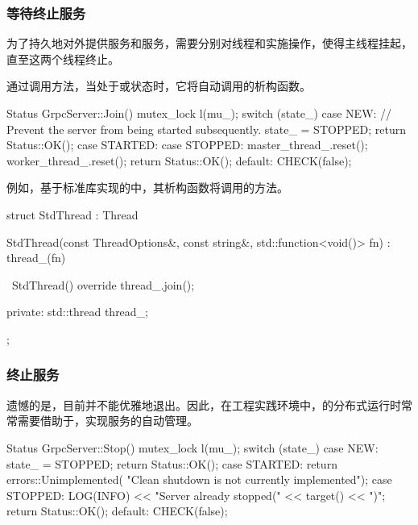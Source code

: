 \begin{content}
\subsubsection{等待终止服务}

为了持久地对外提供服务和服务，需要分别对线程和实施操作，使得主线程挂起，直至这两个线程终止。

通过调用方法，当处于或状态时，它将自动调用的析构函数。

\begin{leftbar}
\begin{c++}
Status GrpcServer::Join() {
  mutex_lock l(mu_);
  switch (state_) {
    case NEW:
      // Prevent the server from being started subsequently.
      state_ = STOPPED;
      return Status::OK();
    case STARTED:
    case STOPPED:
      master_thread_.reset();
      worker_thread_.reset();
      return Status::OK();
    default:
      CHECK(false);
  }
}
\end{c++}
\end{leftbar}

例如，基于标准库实现的中，其析构函数将调用的方法。

\begin{leftbar}
\begin{c++}
struct StdThread : Thread {
  StdThread(const ThreadOptions&, const string&, 
      std::function<void()> fn)
    : thread_(fn) {
  }

  ~StdThread() override { 
    thread_.join(); 
  }

 private:
  std::thread thread_;
};
\end{c++}
\end{leftbar}

\subsubsection{终止服务}

遗憾的是，目前并不能优雅地退出。因此，在工程实践环境中，\tf{}的分布式运行时常常需要借助于，实现服务的自动管理。

\begin{leftbar}
\begin{c++}
Status GrpcServer::Stop() {
  mutex_lock l(mu_);
  switch (state_) {
    case NEW:
      state_ = STOPPED;
      return Status::OK();
    case STARTED:
      return errors::Unimplemented(
          "Clean shutdown is not currently implemented");
    case STOPPED:
      LOG(INFO) << "Server already stopped(" << target() << ")";
      return Status::OK();
    default:
      CHECK(false);
  }
}
\end{c++}
\end{leftbar}


\end{content}
